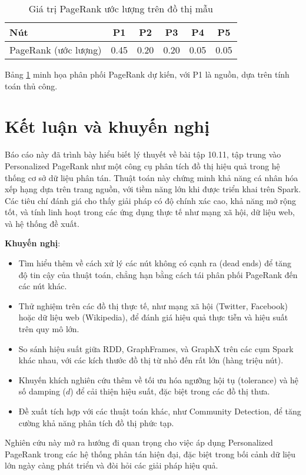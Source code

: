 \documentclass[conference]{IEEEtran}
\begin{document}
\begin{table}[h]
\centering
\begin{tabular}{l c c c c c}
\toprule
Nút & P1 & P2 & P3 & P4 & P5 \\
\midrule
PageRank (ước lượng) & 0.45 & 0.20 & 0.20 & 0.05 & 0.05 \\
\bottomrule
\end{tabular}
\smallskip
\caption{Giá trị PageRank ước lượng trên đồ thị mẫu}
\label{tab:estimate}
\end{table}
Bảng \ref{tab:estimate} minh họa phân phối PageRank dự kiến, với P1 là nguồn, dựa trên tính toán thủ công.

\section{Kết luận và khuyến nghị}
Báo cáo này đã trình bày hiểu biết lý thuyết về bài tập 10.11, tập trung vào Personalized PageRank như một công cụ phân tích đồ thị hiệu quả trong hệ thống cơ sở dữ liệu phân tán. Thuật toán này chứng minh khả năng cá nhân hóa xếp hạng dựa trên trang nguồn, với tiềm năng lớn khi được triển khai trên Spark. Các tiêu chí đánh giá cho thấy giải pháp có độ chính xác cao, khả năng mở rộng tốt, và tính linh hoạt trong các ứng dụng thực tế như mạng xã hội, dữ liệu web, và hệ thống đề xuất.

\textbf{Khuyến nghị}:
\begin{itemize}
    \item Tìm hiểu thêm về cách xử lý các nút không có cạnh ra (dead ends) để tăng độ tin cậy của thuật toán, chẳng hạn bằng cách tái phân phối PageRank đến các nút khác.
    \\
    \item Thử nghiệm trên các đồ thị thực tế, như mạng xã hội (Twitter, Facebook) hoặc dữ liệu web (Wikipedia), để đánh giá hiệu quả thực tiễn và hiệu suất trên quy mô lớn.
    \\
    \item So sánh hiệu suất giữa RDD, GraphFrames, và GraphX trên các cụm Spark khác nhau, với các kích thước đồ thị từ nhỏ đến rất lớn (hàng triệu nút).
    \\
    \item Khuyến khích nghiên cứu thêm về tối ưu hóa ngưỡng hội tụ (tolerance) và hệ số damping (\(d\)) để cải thiện hiệu suất, đặc biệt trong các đồ thị thưa.
    \\
    \item Đề xuất tích hợp với các thuật toán khác, như Community Detection, để tăng cường khả năng phân tích đồ thị phức tạp.
\end{itemize}
Nghiên cứu này mở ra hướng đi quan trọng cho việc áp dụng Personalized PageRank trong các hệ thống phân tán hiện đại, đặc biệt trong bối cảnh dữ liệu lớn ngày càng phát triển và đòi hỏi các giải pháp hiệu quả.
\end{document}
